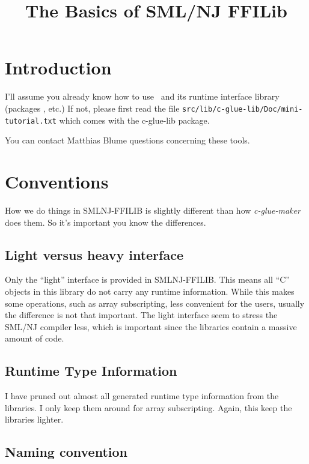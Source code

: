 \documentclass{article}
\title{The Basics of SML/NJ FFILib}
\begin{document}
   \maketitle

\section{Introduction}

    I'll assume you already know how to use \mlnlffigen\ and its runtime 
interface library (packages , etc.)  
If not, please first read
the file {\tt src/lib/c-glue-lib/Doc/mini-tutorial.txt} which comes with
the c-glue-lib package.

    You can contact Matthias Blume 
 questions concerning these tools.

\section{Conventions}

   How we do things in SMLNJ-FFILIB is slightly different than how 
{\em c-glue-maker} does them.  So it's important you know the differences.

\subsection{Light versus heavy interface}

   Only the ``light'' interface is provided in SMLNJ-FFILIB.
This means all ``C'' objects in this library do not carry any runtime 
information.  While this makes some operations, such as array subscripting, 
less convenient for the users, usually the difference is not that important.
The light interface seem to stress the SML/NJ compiler less, which is
important since the libraries contain a massive amount of code.

\subsection{Runtime Type Information}

   I have pruned out almost all generated runtime type information 
from the libraries.  I only keep them around for array subscripting.  
Again, this keep the libraries lighter.

\subsection{Naming convention}
\end{document}
